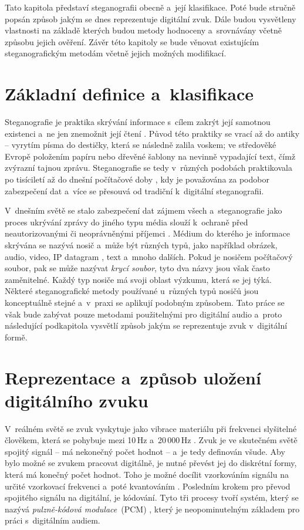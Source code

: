 Tato kapitola představí steganografii obecně a~její klasifikace. Poté bude
stručně popsán způsob jakým se dnes reprezentuje digitální zvuk. Dále budou
vysvětleny vlastnosti na základě kterých budou metody hodnoceny a~srovnávány
včetně způsobu jejich ověření. Závěr této kapitoly se bude věnovat existujícím
steganografickým metodám včetně jejich možných modifikací.

\section{Základní definice a~klasifikace}
\label{sec:definitions}

Steganografie je praktika skrývání informace s~cílem zakrýt její samotnou
existenci a~ne jen znemožnit její čtení
\cite{AlSabhany2020}\cite{Anderson1998}\cite{Djebbar2012}\cite{Dutta2020}.
Původ této praktiky se vrací až do antiky -- vyrytím písma do destičky, která
se následně zalila voskem; ve středověké Evropě položením papíru nebo dřevěné
šablony na nevinně vypadající text, čímž zvýrazní tajnou zprávu. Steganografie
se tedy v~různých podobách praktikovala po tisíciletí až do dnešní počítačové
doby \cite{Anderson1998}, kdy je považována za podobor zabezpečení dat
\cite{Djebbar2012} a~více se přesouvá od tradiční k~digitální steganografii.

V~dnešním světě se stalo zabezpečení dat zájmem všech a~steganografie jako
proces ukrývání zprávy do jiného typu média slouží k~ochraně před
neautorizovanými či neoprávněnými příjemci \cite{Dutta2020}. Médium do kterého
je informace skrývána se nazývá nosič a~může být různých typů, jako například
obrázek, audio, video, IP datagram \cite{Dutta2020}, text a~mnoho dalších.
Pokud je nosičem počítačový soubor, pak se může nazývat \textit{krycí soubor},
tyto dva názvy jsou však často zaměnitelné. Každý typ nosiče má svoji oblast
výzkumu, která se jej týká. Některé steganografické metody používané u~různých
typů nosičů jsou konceptuálně stejné a~v~praxi se aplikují podobným způsobem.
Tato práce se však bude zabývat pouze metodami použitelnými pro digitální
audio a~proto následující podkapitola vysvětlí způsob jakým se reprezentuje
zvuk v~digitální formě.

\section{Reprezentace a~způsob uložení digitálního zvuku}
\label{sec:digital-sound-representation}

V~reálném světě se zvuk vyskytuje jako vibrace materiálu při frekvenci
slyšitelné člověkem, která se pohybuje mezi 10\,Hz a~20\,000\,Hz
\cite{Swanson1998}. Zvuk je ve skutečném světě spojitý signál -- má nekonečný
počet hodnot -- a~je tedy definován všude. Aby bylo možné se zvukem pracovat
digitálně, je nutné převést jej do diskrétní formy, která má konečný počet
hodnot. Toho je možné docílit vzorkováním signálu na určité vzorkovací
frekvenci a~poté kvantováním \cite{Cernocky2021}. Posledním krokem pro převod
spojitého signálu na digitální, je kódování. Tyto tři procesy tvoří systém,
který se nazývá \textit{pulzně-kódová modulace}~(PCM) \cite{Oliver1948}, který
je neopominutelným základem pro práci s~digitálním audiem.

